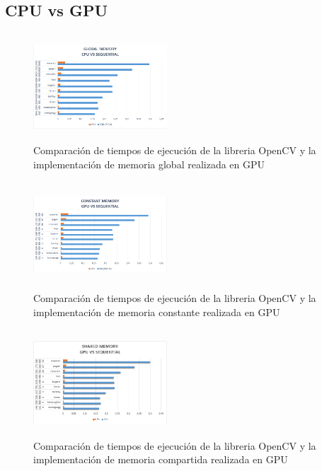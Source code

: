 \documentclass[journal]{IEEEtran}
\begin{document}
\subsection{CPU vs GPU}
\begin{figure}[h]
    \centering
    \includegraphics[width=5cm, height=4cm]{global_memory.png}
    \caption{Comparaci\'on de tiempos de ejecuci\'on de la libreria OpenCV y la implementaci\'on de memoria global realizada en GPU}
    \label{fig:my_label3}
\end{figure}

\begin{figure}[h]
    \centering
    \includegraphics[width=5cm, height=4cm]{constant_memory.png}
    \caption{Comparaci\'on de tiempos de ejecuci\'on de la libreria OpenCV y la implementaci\'on de memoria constante realizada en GPU}
    \label{fig:my_label4}
\end{figure}

\begin{figure}[h]
    \centering
    \includegraphics[width=5cm, height=4cm]{shared_memory.png}
    \caption{Comparaci\'on de tiempos de ejecuci\'on de la libreria OpenCV y la implementaci\'on de memoria compartida realizada en GPU}
    \label{fig:my_label5}
\end{figure}
\end{document}
